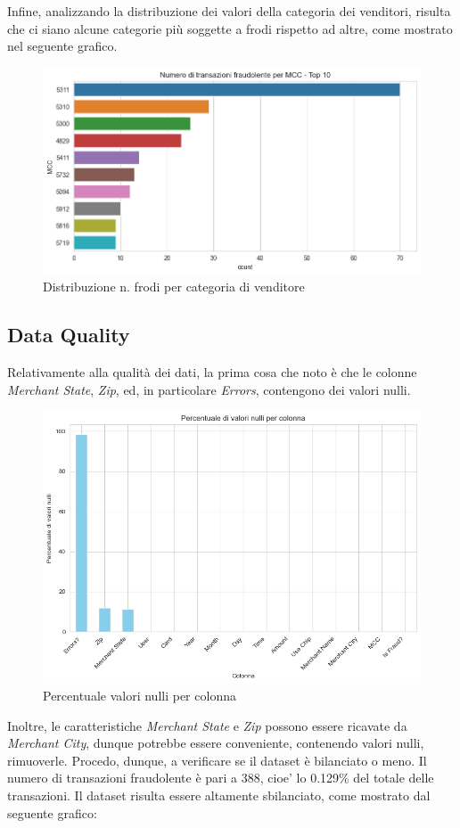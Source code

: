 \documentclass[]{article}
\begin{document}
        Infine, analizzando la distribuzione dei valori della categoria dei venditori, risulta che ci siano alcune categorie più soggette a frodi rispetto ad altre, come mostrato nel seguente grafico.
       \begin{figure}[H]
            \centering
            \includegraphics[width=.4\textwidth]{img/DistribuzioneMCC.png}
            \caption[short]{Distribuzione n. frodi per categoria di venditore}
        \end{figure}
    \newpage
    \subsection{Data Quality}
        Relativamente alla qualità dei dati, la prima cosa che noto è che le colonne \textit{Merchant State}, \textit{Zip}, ed, in particolare \textit{Errors}, contengono dei valori nulli.
        \begin{figure}[H]
            \centering
            \includegraphics[width=.6\textwidth]{img/NullValuesPercentage.png}
            \caption[short]{Percentuale valori nulli per colonna}
        \end{figure}
        Inoltre, le caratteristiche \textit{Merchant State} e \textit{Zip} possono essere ricavate da \textit{Merchant City}, dunque potrebbe essere conveniente, contenendo valori nulli, rimuoverle.
        Procedo, dunque, a verificare se il dataset è bilanciato o meno. Il numero di transazioni fraudolente è pari a 388, cioe' lo 0.129\% del totale delle transazioni. Il dataset risulta essere altamente sbilanciato, come mostrato dal seguente grafico:
\end{document}
